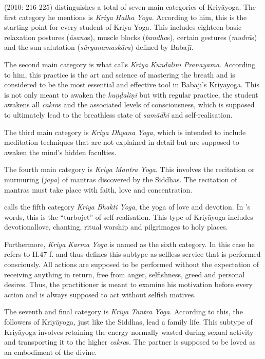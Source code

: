 \citeauthor{govindan2010} (2010: 216-225) distinguishes a total of seven main categories of Kriyāyoga. The first category he mentions is \textit{Kriya Hatha Yoga}. According to him, this is the starting point for every student of Kriya Yoga. This includes eighteen basic relaxation postures (\textit{āsana}s), muscle blocks (\textit{bandha}s), certain gestures (\textit{mudrā}s) and the sun salutation (\textit{sūryanamaskāra}) defined by Babajī.

The second main category is what \citeauthor{govindan2010} calls \textit{Kriya Kundalini Pranayama}. According to him, this practice is the art and science of mastering the breath and is considered to be the most essential and effective tool in Babajī's Kriyāyoga. This is not only meant to awaken the \textit{kuṇḍaliṇī} but with regular practice, the student awakens all \textit{cakra}s and the associated levels of consciousness, which is supposed to ultimately lead to the breathless state of \textit{samādhi} and self-realisation.

The third main category is \textit{Kriya Dhyana Yoga}, which is intended to include meditation techniques that are not explained in detail but are supposed to awaken the mind's hidden faculties.

The fourth main category is \textit{Kriya Mantra Yoga}. This involves the recitation or murmuring (\textit{japa}) of mantras discovered by the Siddhas. The recitation of mantras must take place with faith, love and concentration.

\citeauthor{govindan2010} calls the fifth category \textit{Kriya Bhakti Yoga}, the yoga of love and devotion. In \citeauthor{govindan2010}'s words, this is the ``turbojet'' of self-realisation. This type of Kriyāyoga includes devotionallove, chanting, ritual worship and pilgrimages to holy places.

Furthermore, \textit{Kriya Karma Yoga} is named as the sixth category. In this case he refers to  II.47 f. and thus defines this subtype as selfless service that is performed consciously. All actions are supposed to be performed without the expectation of receiving anything in return, free from anger, selfishness, greed and personal desires. Thus, the practitioner is meant to examine his motivation before every action and is always supposed to act without selfish motives.

The seventh and final category is \textit{Kriya Tantra Yoga}. According to this, the followers of Kriyāyoga, just like the Siddhas, lead a family life. This subtype of Kriyāyoga involves retaining the energy normally wasted during sexual activity and transporting it to the higher \textit{cakra}s. The partner is supposed to be loved as an embodiment of the divine.

